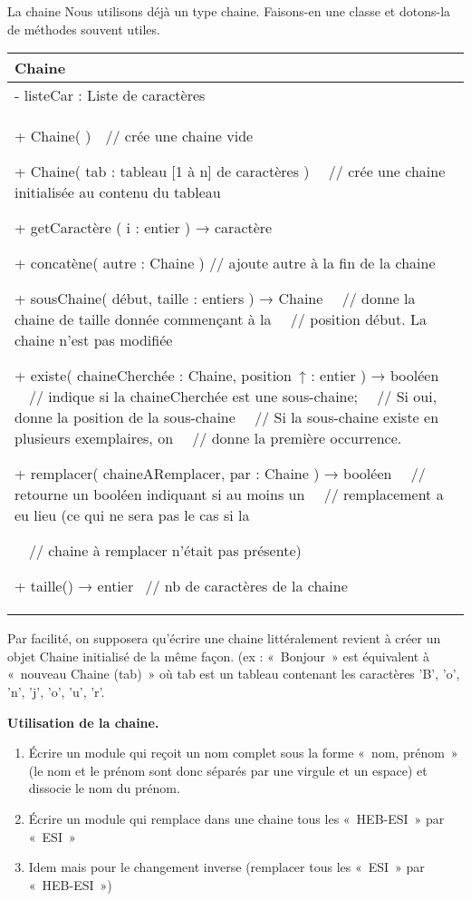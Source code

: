 \begin{Exercice}{La chaine}
	Nous utilisons déjà un type chaine.
	Faisons-en une classe et dotons-la de
	méthodes souvent utiles.

	\begin{center}
	\tablehead{}
	\begin{supertabular}{|m{11.597cm}|}
		\hline
		\centering\arraybslash  Chaine\\\hline
		 {}- listeCar : Liste de caractères\\\hline
		{ + Chaine( )\ \ // crée une chaine vide}

		{ {+ }Chaine( tab : tableau [1 à n] de caractères )
		\ \ // crée une chaine initialisée au contenu du tableau}

		{ {+ getCaractère ( i : entier ) }\textsf{→} {caractère}}

		{ + concatène( autre : Chaine ) // ajoute autre à
		la fin de la chaine}

		{ {+ sousChaine( début,
		taille : entiers ) }\textsf{→} {Chaine
		\ \ // donne la chaine de taille donnée commençant à la
		\ \ // position début. La chaine n'est pas modifiée}}

		{ {+ existe(
		chaineCherchée : Chaine, position~}\textsf{↑}
		:{ entier ) }\textsf{→}
		{booléen
		\ \ // indique si la chaineCherchée est une sous-chaine;
		\ \ // Si oui, donne la position de la sous-chaine
		\ \ // Si la sous-chaine existe en plusieurs exemplaires, on
		\ \ // donne la première occurrence.}}

		{ {+ remplacer(
		chaineARemplacer, par : Chaine ) }\textsf{→}
		{booléen
		\ \ // retourne un booléen indiquant si au moins un
		\ \ // remplacement a eu lieu (ce qui ne sera pas le cas si la}}

		{ \ \ // chaine à remplacer n’était pas
		présente)}

		 {+ taille() }\textsf{→}
		{entier \ // nb de caractères de la
		chaine}\\\hline
	\end{supertabular}
	\end{center}
	
	Par facilité, on supposera qu’écrire une chaine littéralement revient à
	créer un objet Chaine initialisé de la même façon. (ex : «~Bonjour~»
	est équivalent à «~nouveau Chaine (tab)~» où tab est un tableau
	contenant les caractères 'B',
	'o',
	'n',
	'j',
	'o',
	'u',
	'r'.

	\textbf{Utilisation de la chaine.}

	\begin{enumerate}[label=\alph*)]
		\item 
			Écrire un module qui reçoit un nom complet
			sous la forme «~nom, prénom~» (le nom et le prénom sont donc séparés
			par une virgule et un espace) et dissocie le nom du prénom. 
		\item 
			Écrire un module qui remplace dans une chaine
			tous les «~HEB-ESI~» par «~ESI~»
		\item 
			Idem mais pour le changement inverse 
			(remplacer tous les «~ESI~» par «~HEB-ESI~»)
	\end{enumerate}
\end{Exercice}

